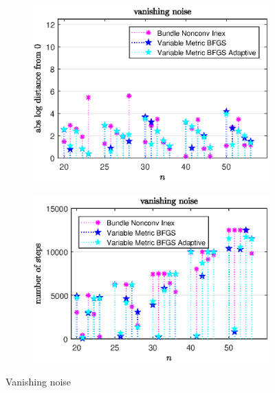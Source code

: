 \begin{figure}[H]
	\begin{subfigure}{0.49\textwidth}
		\includegraphics[width=\textwidth]{Pictures/Plots/vanishing_noise_b.eps}%
	\end{subfigure}
	\begin{subfigure}{0.49\textwidth}
		\includegraphics[width=\textwidth]{Pictures/Plots/steps_vanishing_noise_b.eps}%
	\end{subfigure}
	\caption{Vanishing noise}%
	\label{fig_van_noise_large}%
\end{figure}

